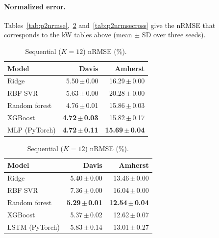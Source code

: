\documentclass[11pt,letterpaper]{article}
\begin{document}
\paragraph{Normalized error.}
Tables~\ref{tab:p2nrmse},~\ref{tab:p2seqnrmse} and~\ref{tab:p2nrmsecross} give the nRMSE that
corresponds to the kW tables above (mean $\pm$ SD over three seeds).

\begin{table}[!htbp]\centering\scriptsize
\setlength{\tabcolsep}{4pt}
\begin{minipage}[t]{0.46\textwidth}\centering
\caption{Same-city nRMSE (\%).}\label{tab:p2nrmse}
\begin{tabular}{@{}lrr@{}}\toprule
\textbf{Model} & \textbf{Davis} & \textbf{Amherst}\\\midrule
Ridge & 5.50\,$\pm$\,0.00 & 16.29\,$\pm$\,0.00\\
RBF SVR & 5.63\,$\pm$\,0.00 & 20.28\,$\pm$\,0.00\\
Random forest & 4.76\,$\pm$\,0.01 & 15.86\,$\pm$\,0.03\\
XGBoost & \textbf{4.72\,$\pm$\,0.03} & 15.82\,$\pm$\,0.17\\
MLP (PyTorch) & \textbf{4.72\,$\pm$\,0.11} & \textbf{15.69\,$\pm$\,0.04}\\
\bottomrule\end{tabular}
\end{minipage}\hfill
\begin{minipage}[t]{0.50\textwidth}\centering
\caption{Sequential ($K=12$) nRMSE (\%).}\label{tab:p2seqnrmse}
\begin{tabular}{@{}lrr@{}}\toprule
\textbf{Model} & \textbf{Davis} & \textbf{Amherst}\\\midrule
Ridge & 5.40\,$\pm$\,0.00 & 13.46\,$\pm$\,0.00\\
RBF SVR & 7.36\,$\pm$\,0.00 & 16.04\,$\pm$\,0.00\\
Random forest & \textbf{5.29\,$\pm$\,0.01} & \textbf{12.54\,$\pm$\,0.04}\\
XGBoost & 5.37\,$\pm$\,0.02 & 12.62\,$\pm$\,0.07\\
LSTM (PyTorch) & 5.83\,$\pm$\,0.14 & 13.01\,$\pm$\,0.27\\
\bottomrule\end{tabular}
\end{minipage}
\end{table}
\end{document}
